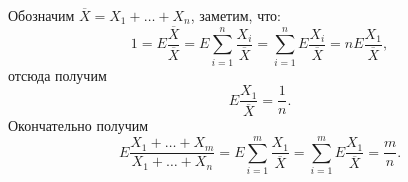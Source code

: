 \documentclass{article}
\begin{document}
Обозначим $\overline{X}=X_1 + \ldots + X_n$, заметим, что:
$$1=E\frac{\overline{X}}{\overline{X}}=E\sum\limits_{i=1}^{n}\frac{X_i}{\overline{X}}=\sum\limits_{i=1}^{n}E\frac{X_i}{\overline{X}}=nE\frac{X_1}{\overline{X}},$$
отсюда получим
$$E\frac{X_1}{\overline{X}}=\frac{1}{n}.$$
Окончательно получим
$$E\frac{X_1 + \ldots + X_m}{X_1 + \ldots + X_n}=E\sum_{i=1}^{m}\frac{X_1}{\overline{X}}=\sum_{i=1}^{m}E\frac{X_1}{\overline{X}}=\frac{m}{n}.$$
\end{document}
